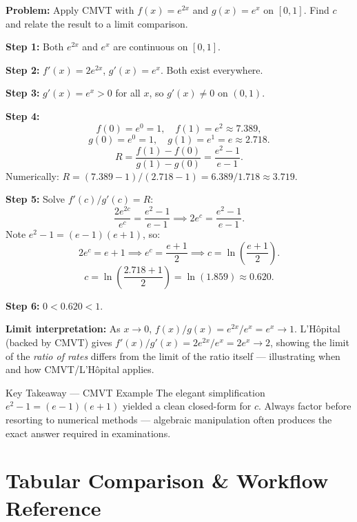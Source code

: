 \documentclass[12pt,a4paper]{article}
\begin{document}
\noindent\textbf{Problem:} Apply CMVT with $f(x) = e^{2x}$ and $g(x) = e^x$ on $[0, 1]$.
Find $c$ and relate the result to a limit comparison.

\medskip
\textbf{Step 1:} Both $e^{2x}$ and $e^x$ are continuous on $[0,1]$. \checkmark

\textbf{Step 2:} $f'(x) = 2e^{2x}$, $g'(x) = e^x$. Both exist everywhere. \checkmark

\textbf{Step 3:} $g'(x) = e^x > 0$ for all $x$, so $g'(x) \neq 0$ on $(0,1)$. \checkmark

\textbf{Step 4:}
\[
  f(0) = e^0 = 1, \quad f(1) = e^2 \approx 7.389,
\]
\[
  g(0) = e^0 = 1, \quad g(1) = e^1 = e \approx 2.718.
\]
\[
  R = \frac{f(1)-f(0)}{g(1)-g(0)} = \frac{e^2 - 1}{e - 1}.
\]
Numerically: $R = (7.389 - 1)/(2.718 - 1) = 6.389/1.718 \approx 3.719$.

\textbf{Step 5:} Solve $f'(c)/g'(c) = R$:
\[
  \frac{2e^{2c}}{e^c} = \frac{e^2 - 1}{e - 1} \implies 2e^c = \frac{e^2-1}{e-1}.
\]
Note $e^2-1 = (e-1)(e+1)$, so:
\[
  2e^c = e+1 \implies e^c = \frac{e+1}{2} \implies c = \ln\!\left(\frac{e+1}{2}\right).
\]
\[
  c = \ln\!\left(\frac{2.718+1}{2}\right) = \ln(1.859) \approx 0.620.
\]

\textbf{Step 6:} $0 < 0.620 < 1$. \checkmark

\textbf{Limit interpretation:}
As $x \to 0$, $f(x)/g(x) = e^{2x}/e^x = e^x \to 1$. L'H\^{o}pital (backed by CMVT) gives
$f'(x)/g'(x) = 2e^{2x}/e^x = 2e^x \to 2$, showing the limit of the \emph{ratio of rates}
differs from the limit of the ratio itself --- illustrating when and how CMVT/L'H\^{o}pital
applies.

\begin{learnbox}{Key Takeaway --- CMVT Example}
The elegant simplification $e^2 - 1 = (e-1)(e+1)$ yielded a clean closed-form for $c$.
Always factor before resorting to numerical methods --- algebraic manipulation often produces
the exact answer required in examinations.
\end{learnbox}

\section{Tabular Comparison \& Workflow Reference}
\end{document}
